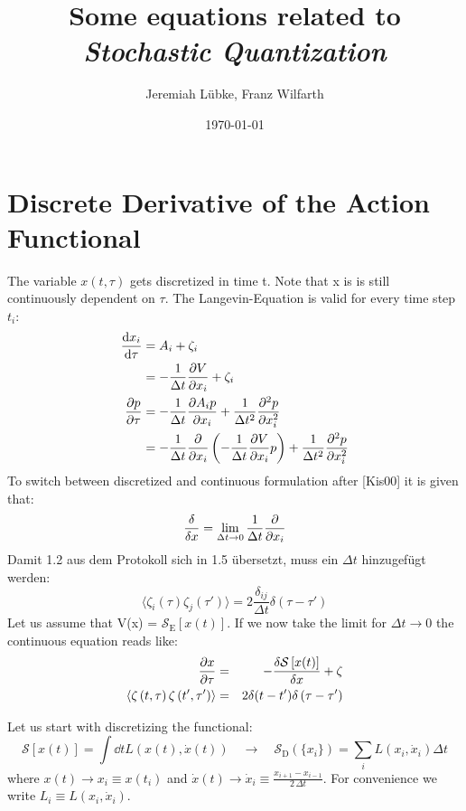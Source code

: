 \documentclass[11pt,a4paper]{scrartcl}
\title{Some equations related to \emph{Stochastic Quantization}}
\author{Jeremiah Lübke, Franz Wilfarth}
\date{\today}
\newcommand{\action}{\ensuremath{\mathcal{S}}}
\newcommand{\SD}{\ensuremath{\mathcal{S}_{\mathrm{D}}}}
\newcommand{\xdoti}{\ensuremath{\dot{x}_i}}
\newcommand{\OverDeltaT}[1]{\ensuremath{\frac{#1}{\Delta t}}}
\newcommand{\OverTwoDeltaT}[1]{\ensuremath{\frac{#1}{2\, \Delta t}}}
\begin{document}
\maketitle

\section*{Discrete Derivative of the Action Functional}
The variable $x(t,\tau)$ gets discretized in time t. Note that x is is still continuously dependent on $\tau$.
The Langevin-Equation is valid for every time step $t_i$:
\begin{align}
    \dv{x_i}{\tau} &= A_i + \zeta_i\\
                &= - \frac{1}{\Delta t} \pdv{V}{x_i} + \zeta_i\\
    \pdv{p}{\tau} &= - \frac{1}{\Delta t} \pdv{A_i p}{x_i} + \frac{1}{\Delta t^2} \pdv[2]{p}{x_i}\\
    &= - \frac{1}{\Delta t} \pdv{x_i} \left( - \frac{1}{\Delta t} \pdv{V}{x_i} p \right) + \frac{1}{\Delta t^2} \pdv[2]{p}{x_i}
\end{align}
To switch between discretized and continuous formulation after [Kis00] it is given that:
\begin{equation*}
    \frac{\delta}{\delta x} = \lim\limits_{\Delta t \to 0} \OverDeltaT{1} \pdv{x_i}
\end{equation*}
Damit 1.2 aus dem Protokoll sich in 1.5 übersetzt, muss ein $\Delta t$ hinzugefügt werden:
\begin{equation*}
    \langle \zeta_i \left(\tau \right) \zeta_j \left( \tau' \right) \rangle = 2 \frac{\delta_{ij}}{\Delta t} \delta\left( \tau - \tau' \right)
\end{equation*}
Let us assume that V(x) = $\action_\mathrm{E}\left[x(t)\right]$.
If we now take the limit for $\Delta t \rightarrow 0$ the continuous equation reads like:
\begin{eqnarray*}
    \pdv{x}{\tau} &=& - \frac{\delta \mathcal{S}\left[x(t)\right]}{\delta x}  + \zeta\\
    \langle \zeta \left(t,\tau \right) \zeta \left( t',\tau' \right) \rangle &=& 2 \delta(t - t') \delta\left( \tau - \tau' \right)
\end{eqnarray*}

Let us start with discretizing the functional:
\begin{equation*}
    \mathcal{S}\left[x(t)\right] = \int\dd{t}L\left(x(t), \dot{x}(t)\right)
    \quad\longrightarrow\quad
    \SD\left(\{x_i\}\right) = \sum_i L\left(x_i, \xdoti\right)\Delta t
\end{equation*}
where $x(t) \longrightarrow x_i \equiv x(t_i)$ and $\dot{x}(t) \longrightarrow
\xdoti \equiv \OverTwoDeltaT{x_{i+1}-x_{i-1}}$. For convenience we write $L_i \equiv
L(x_i, \xdoti)$.\\
\end{document}
